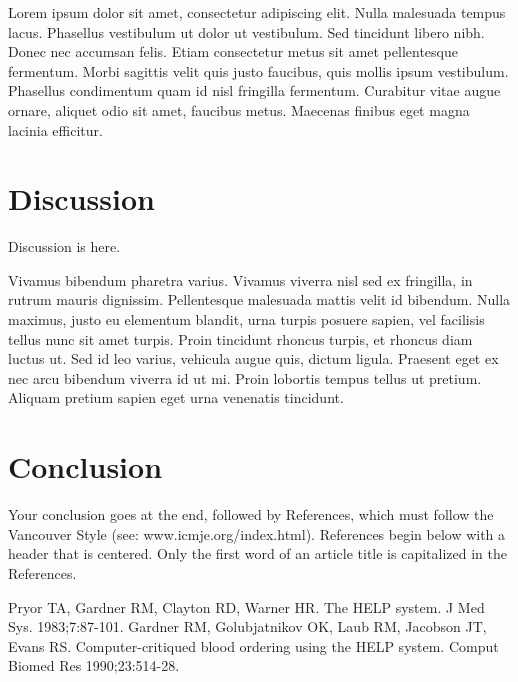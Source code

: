 \documentclass{amia}
\begin{document}
Lorem ipsum dolor sit amet, consectetur adipiscing elit. Nulla malesuada tempus lacus. Phasellus vestibulum ut dolor ut vestibulum. Sed tincidunt libero nibh. Donec nec accumsan felis. Etiam consectetur metus sit amet pellentesque fermentum. Morbi sagittis velit quis justo faucibus, quis mollis ipsum vestibulum. Phasellus condimentum quam id nisl fringilla fermentum. Curabitur vitae augue ornare, aliquet odio sit amet, faucibus metus. Maecenas finibus eget magna lacinia efficitur.


\section*{Discussion}
Discussion is here.

Vivamus bibendum pharetra varius. Vivamus viverra nisl sed ex fringilla, in rutrum mauris dignissim. Pellentesque malesuada mattis velit id bibendum. Nulla maximus, justo eu elementum blandit, urna turpis posuere sapien, vel facilisis tellus nunc sit amet turpis. Proin tincidunt rhoncus turpis, et rhoncus diam luctus ut. Sed id leo varius, vehicula augue quis, dictum ligula. Praesent eget ex nec arcu bibendum viverra id ut mi. Proin lobortis tempus tellus ut pretium. Aliquam pretium sapien eget urna venenatis tincidunt.

\section*{Conclusion}
Your conclusion goes at the end, followed by References, which must follow the Vancouver Style (see: www.icmje.org/index.html).  References begin below with a header that is centered.  Only the first word of an article title is capitalized in the References.

\makeatletter
\renewcommand{\@biblabel}[1]{\hfill #1.}
\makeatother




\begin{thebibliography}{1}
\setlength\itemsep{-0.1em}

Pryor TA, Gardner RM, Clayton RD, Warner HR. The HELP system. J Med Sys. 1983;7:87-101.
Gardner RM, Golubjatnikov OK, Laub RM, Jacobson JT, Evans RS. Computer-critiqued blood ordering using the HELP system. Comput Biomed Res 1990;23:514-28.



\end{thebibliography}
\end{document}

